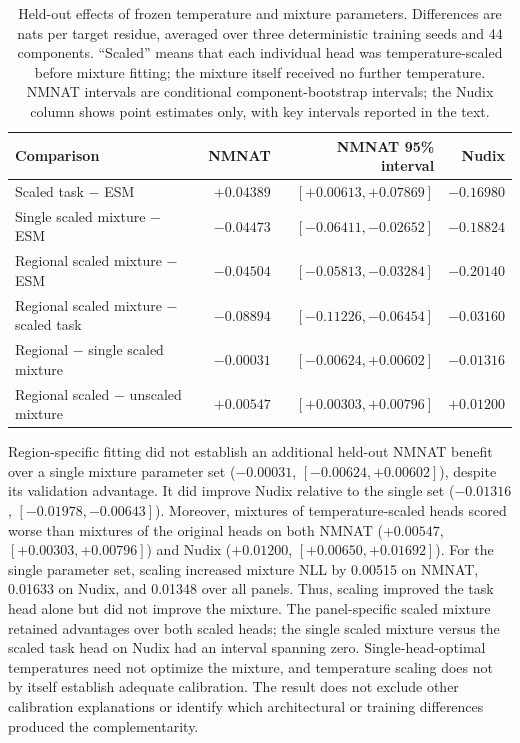 \documentclass[referee,pdflatex,sn-vancouver-num]{sn-jnl}
\begin{document}
\begin{table}[ht]
\centering\small
\caption{Held-out effects of frozen temperature and mixture parameters. Differences are nats per target residue, averaged over three deterministic training seeds and 44 components. ``Scaled'' means that each individual head was temperature-scaled before mixture fitting; the mixture itself received no further temperature. NMNAT intervals are conditional component-bootstrap intervals; the Nudix column shows point estimates only, with key intervals reported in the text.}\label{tab:head_calibration}
\setlength{\tabcolsep}{3pt}
\begin{tabular}{lrrr}
\toprule
Comparison & NMNAT & NMNAT 95\% interval & Nudix \\
\midrule
Scaled task $-$ ESM & $+0.04389$ & $[+0.00613,+0.07869]$ & $-0.16980$ \\
Single scaled mixture $-$ ESM & $-0.04473$ & $[-0.06411,-0.02652]$ & $-0.18824$ \\
Regional scaled mixture $-$ ESM & $-0.04504$ & $[-0.05813,-0.03284]$ & $-0.20140$ \\
Regional scaled mixture $-$ scaled task & $-0.08894$ & $[-0.11226,-0.06454]$ & $-0.03160$ \\
Regional $-$ single scaled mixture & $-0.00031$ & $[-0.00624,+0.00602]$ & $-0.01316$ \\
Regional scaled $-$ unscaled mixture & $+0.00547$ & $[+0.00303,+0.00796]$ & $+0.01200$ \\
\bottomrule
\end{tabular}
\end{table}

Region-specific fitting did not establish an additional held-out NMNAT benefit over a single mixture parameter set ($-0.00031$, $[-0.00624,+0.00602]$), despite its validation advantage. It did improve Nudix relative to the single set ($-0.01316$, $[-0.01978,-0.00643]$). Moreover, mixtures of temperature-scaled heads scored worse than mixtures of the original heads on both NMNAT ($+0.00547$, $[+0.00303,+0.00796]$) and Nudix ($+0.01200$, $[+0.00650,+0.01692]$). For the single parameter set, scaling increased mixture NLL by 0.00515 on NMNAT, 0.01633 on Nudix, and 0.01348 over all panels. Thus, scaling improved the task head alone but did not improve the mixture. The panel-specific scaled mixture retained advantages over both scaled heads; the single scaled mixture versus the scaled task head on Nudix had an interval spanning zero. Single-head-optimal temperatures need not optimize the mixture, and temperature scaling does not by itself establish adequate calibration. The result does not exclude other calibration explanations or identify which architectural or training differences produced the complementarity.
\end{document}
